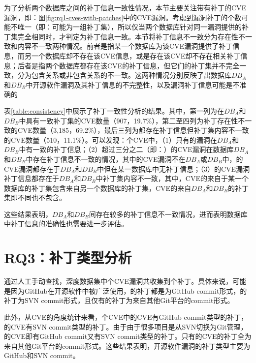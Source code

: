 为了分析两个数据库之间的补丁信息一致性情况，本节主要关注带有补丁的CVE漏洞，即：图\ref{fig:rq1-cves-with-patches}中的CVE漏洞。考虑到漏洞补丁的个数可能不唯一（即：可能为一组补丁集），所以仅当两个数据库针对同一漏洞提供的补丁集完全相同时，才判定为补丁信息一致。本节将补丁信息不一致分为存在性不一致和内容不一致两种情况。前者是指某一个数据库为该CVE漏洞提供了补丁信息，而另一个数据库却不存在该CVE信息，或是存在该CVE却不存在相关补丁信息；后者是指两个数据库都存在该CVE的补丁信息，但它们的补丁集并不完全一致，分为包含关系或非包含关系的不一致。这两种情况分别反映了出数据库$DB_A$和$DB_B$中开源软件漏洞及其补丁信息的不完整性，以及漏洞补丁信息可能是不准确的


表\ref{table:consistency}中展示了补丁一致性分析的结果。其中，第一列为在$DB_A$和$DB_B$中具有一致补丁集的CVE数量（907，19.7\%），第二至四列为补丁存在性不一致的CVE数量（3,185，69.2\%），最后三列为都存在补丁信息但补丁集内容不一致的CVE数量（510，11.1\%）。可以发现：个CVE中，（1）只有的漏洞在$DB_A$和$DB_B$中有一致的补丁信息；（2）超过三分之二（即：）的CVE漏洞在数据库$DB_A$和$DB_B$中存在补丁信息不一致的情况，其中的CVE漏洞不在$DB_{A}$或$DB_{B}$中，的CVE漏洞都存在于$DB_{A}$和$DB_{B}$中但在某一数据库中无补丁信息；（3）的CVE漏洞补丁信息都存在于$DB_{A}$和$DB_{B}$中补丁集内容不一致，其中，CVE的来自于某一个数据库的补丁集包含来自另一个数据库的补丁集，CVE的来自$DB_{A}$和$DB_{B}$的补丁集即不同也不包含。

这些结果表明，$DB_A$和$DB_B$间存在较多的补丁信息不一致情况，进而表明数据库中补丁信息的准确性也需要进一步评估。


\section{RQ3：补丁类型分析}\label{sec:type}

通过人工手动查找，深度数据集中个CVE漏洞共收集到个补丁。具体来说，可能是因为GitHub在开源软件中被广泛使用，的补丁都是为GitHub commit形式，的补丁为SVN commit形式，且仅有的补丁为来自其他Git平台的commit形式。

此外，从CVE的角度统计来看，个CVE中的CVE有GitHub commit类型的补丁，的CVE有SVN commit类型的补丁。由于由于很多项目是从SVN切换为Git管理，的CVE即有GitHub commit又有SVN commit类型的补丁。只有的CVE的补丁全为来自其他Git平台的commit形式。这些结果表明，开源软件漏洞的补丁类型主要为GitHub和SVN commit。

